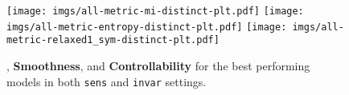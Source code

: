 \begin{figure*}[ht]
    \centering
    \texttt{[image: imgs/all-metric-mi-distinct-plt.pdf]}
    \texttt{[image: imgs/all-metric-entropy-distinct-plt.pdf]}
    \texttt{[image: imgs/all-metric-relaxed1\_sym-distinct-plt.pdf]}
    \caption{\nmi, \textbf{Smoothness}, and \textbf{Controllability} for the best performing models in both \texttt{sens} and \texttt{invar} settings.}
    \label{fig:best-models-mmscore-smoothness-sym}
\end{figure*}